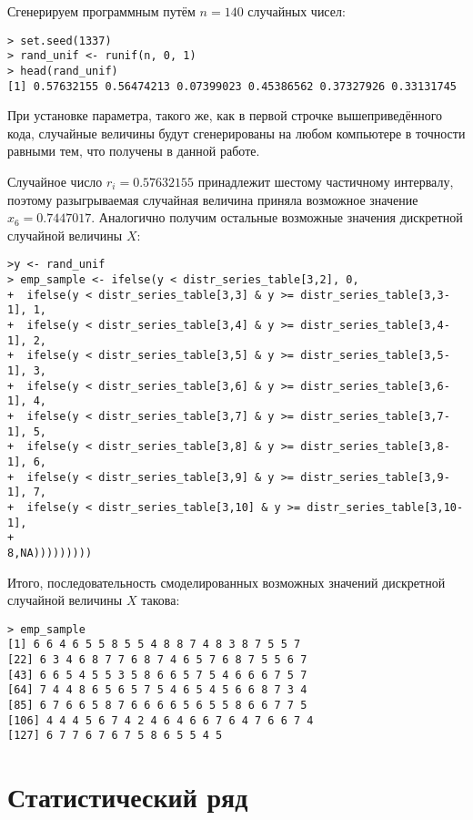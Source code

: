 \documentclass[14pt,a4paper]{scrartcl}
\begin{document}
Сгенерируем программным путём $n = 140$ случайных чисел:
\begin{lstlisting}
> set.seed(1337)
> rand_unif <- runif(n, 0, 1)
> head(rand_unif)
[1] 0.57632155 0.56474213 0.07399023 0.45386562 0.37327926 0.33131745
\end{lstlisting}
При установке параметра, такого же, как в первой строчке вышеприведённого кода, случайные величины будут сгенерированы на любом компьютере в точности равными тем, что получены в данной работе.

Случайное число $r_i = 0.57632155$ принадлежит шестому частичному интервалу, поэтому разыгрываемая случайная  величина приняла возможное значение $x_6 = 0.7447017$. Аналогично получим остальные возможные значения дискретной случайной величины $X$:

\begin{lstlisting}[basicstyle=\small]
>y <- rand_unif
> emp_sample <- ifelse(y < distr_series_table[3,2], 0, 
+  ifelse(y < distr_series_table[3,3] & y >= distr_series_table[3,3-1], 1, 
+  ifelse(y < distr_series_table[3,4] & y >= distr_series_table[3,4-1], 2, 
+  ifelse(y < distr_series_table[3,5] & y >= distr_series_table[3,5-1], 3, 
+  ifelse(y < distr_series_table[3,6] & y >= distr_series_table[3,6-1], 4,
+  ifelse(y < distr_series_table[3,7] & y >= distr_series_table[3,7-1], 5,
+  ifelse(y < distr_series_table[3,8] & y >= distr_series_table[3,8-1], 6,
+  ifelse(y < distr_series_table[3,9] & y >= distr_series_table[3,9-1], 7,
+  ifelse(y < distr_series_table[3,10] & y >= distr_series_table[3,10-1], 
+                                                            8,NA)))))))))
\end{lstlisting}

Итого, последовательность смоделированных возможных значений дискретной случайной величины $X$ такова:
\begin{lstlisting}
> emp_sample
[1] 6 6 4 6 5 5 8 5 5 4 8 8 7 4 8 3 8 7 5 5 7
[22] 6 3 4 6 8 7 7 6 8 7 4 6 5 7 6 8 7 5 5 6 7
[43] 6 6 5 4 5 5 3 5 8 6 6 5 7 5 4 6 6 6 7 5 7
[64] 7 4 4 8 6 5 6 5 7 5 4 6 5 4 5 6 6 8 7 3 4
[85] 6 7 6 6 5 8 7 6 6 6 6 5 6 5 5 8 6 6 7 7 5
[106] 4 4 4 5 6 7 4 2 4 6 4 6 6 7 6 4 7 6 6 7 4
[127] 6 7 7 6 7 6 7 5 8 6 5 5 4 5
\end{lstlisting}


\section{Статистический ряд}
\end{document}
